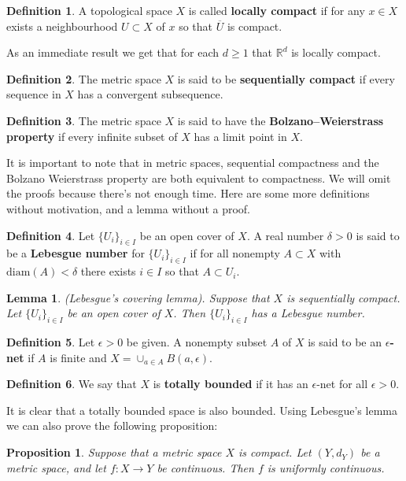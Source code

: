 \documentclass[11pt,a4paper]{article}
\theoremstyle{definition}
\newtheorem{definition}{Definition}[section]
\theoremstyle{plain}
\newtheorem{proposition}[theorem]{Proposition}
\newtheorem{lemma}[theorem]{Lemma}
\newcommand{\R}{\mathbb{R}}
\begin{document}
  \begin{definition}
    A topological space $X$ is called \textbf{locally compact} if for
    any $x \in X$ exists a neighbourhood $U \subset X$ of $x$ so that
    $\overline{U}$ is compact.
  \end{definition}
  As an immediate result we get that for each $d \geq 1$ that $\R^d$
  is locally compact.
  \begin{definition}
    The metric space $X$ is said to be \textbf{sequentially compact} 
    if every sequence in $X$ has a convergent subsequence.
  \end{definition}
  \begin{definition}
    The metric space $X$ is said to have the 
    \textbf{Bolzano–Weierstrass property} if every infinite subset of 
    $X$ has a limit point in $X$.
  \end{definition}
  It is important to note that in metric spaces, sequential compactness and 
  the Bolzano Weierstrass property are both
  equivalent to compactness. We will omit the proofs because there's not
  enough time. Here are some more definitions without
  motivation, and a lemma without a proof.
  \begin{definition}
    Let $\{U_i\}_{i \in I}$ be an open cover of $X$. A real number 
    $\delta > 0$ is said to be a \textbf{Lebesgue number} 
    for $\{U_i\}_{i \in I}$
    if for all nonempty $A \subset X$ with $\text{diam}(A) < \delta$
    there exists $i \in I$ so that $A \subset U_i$.
  \end{definition}
  \begin{lemma}
    (Lebesgue’s covering lemma). Suppose that $X$ is sequentially 
    compact. Let $\{U_i\}_{i \in I}$ be an open cover of $X$. 
    Then $\{U_i\}_{i \in I}$ has a Lebesgue number.
  \end{lemma}
  \begin{definition}
    Let $\epsilon > 0$ be given. A nonempty subset $A$ of $X$ is 
    said to be an \textbf{$\epsilon$-net} if $A$ is finite and 
    $X = \cup_{a \in A}{B(a, \epsilon)}$.
  \end{definition}
  \begin{definition}
    We say that $X$ is \textbf{totally bounded} if it has an 
    $\epsilon$-net for all $\epsilon > 0$.
  \end{definition}
  It is clear that a totally bounded space is also bounded. 
  Using Lebesgue's lemma we can also prove the following proposition:
  \begin{proposition}
    Suppose that a metric space $X$ is compact. Let $(Y, d_Y)$ be a 
    metric space, and let $f \colon X \to Y$ be continuous. Then $f$ is 
    uniformly continuous.	
  \end{proposition}
\end{document}
